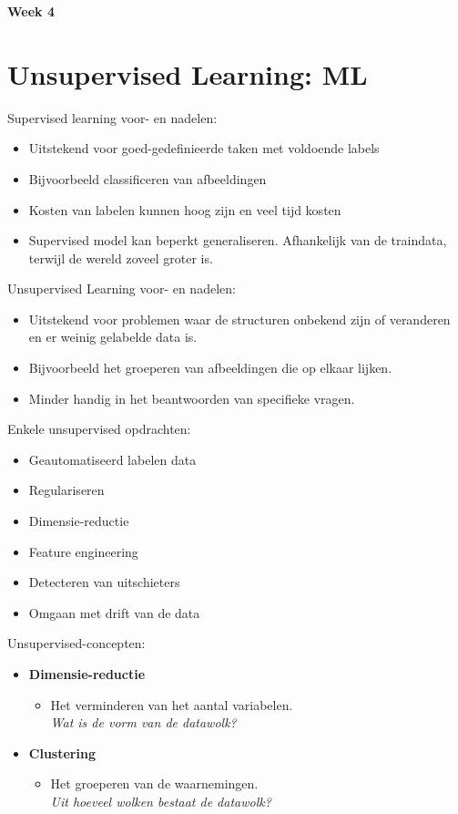 {\large
\textbf{{\LARGE Week 4}}
\section{Unsupervised Learning: ML}
Supervised learning voor- en nadelen:
\begin{itemize}
    \item Uitstekend voor goed-gedefinieerde taken met voldoende labels
    \item Bijvoorbeeld classificeren van afbeeldingen
    \item Kosten van labelen kunnen hoog zijn en veel tijd kosten
    \item Supervised model kan beperkt generaliseren. Afhankelijk van de traindata, terwijl de wereld zoveel groter is.
\end{itemize}
Unsupervised Learning voor- en nadelen:
\begin{itemize}
    \item Uitstekend voor problemen waar de structuren onbekend zijn of veranderen en er weinig gelabelde data is.
    \item Bijvoorbeeld het groeperen van afbeeldingen die op elkaar lijken.
    \item Minder handig in het beantwoorden van specifieke vragen.
\end{itemize}
Enkele unsupervised opdrachten:
\begin{itemize}
    \item Geautomatiseerd labelen data
    \item Regulariseren
    \item Dimensie-reductie
    \item Feature engineering
    \item Detecteren van uitschieters
    \item Omgaan met drift van de data
\end{itemize}
Unsupervised-concepten:
\begin{itemize}
    \item \textbf{Dimensie-reductie}
    \begin{itemize}
        \item Het verminderen van het aantal variabelen.\\
        \textit{Wat is de vorm van de datawolk?}
    \end{itemize}
    \item \textbf{Clustering}
    \begin{itemize}
        \item Het groeperen van de waarnemingen.\\
        \textit{Uit hoeveel wolken bestaat de datawolk?}
    \end{itemize}
\end{itemize}
}
